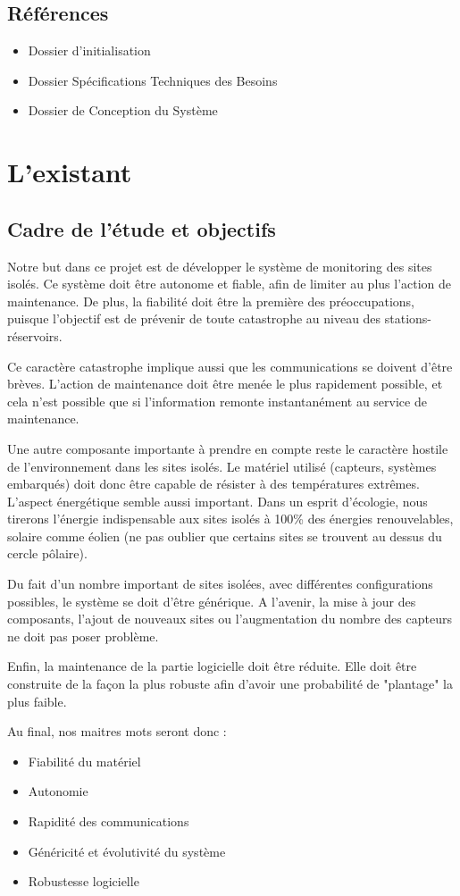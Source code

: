   \subsection{Références}
    \begin{itemize}
      \item Dossier d'initialisation
      \item Dossier Spécifications Techniques des Besoins
      \item Dossier de Conception du Système
    \end{itemize}  
      
\section{L'existant}
  \subsection{Cadre de l'étude et objectifs}  
  Notre but dans ce projet est de développer le système de monitoring des sites isolés. Ce système doit être autonome et fiable, afin de limiter au plus l'action de maintenance. De plus,  la fiabilité doit être la première des préoccupations, puisque l'objectif est de prévenir de toute catastrophe au niveau des stations-réservoirs.
\par Ce caractère catastrophe implique aussi que les communications se doivent d'être brèves. L'action de maintenance doit être menée le plus rapidement possible, et cela n'est possible que si l'information remonte instantanément au service de maintenance.
\par  Une autre composante importante à prendre en compte reste le caractère hostile de l'environnement dans les sites isolés. Le matériel utilisé (capteurs, systèmes embarqués) doit donc être capable de résister à des températures extrêmes. L'aspect énergétique semble aussi important. Dans un esprit d'écologie, nous tirerons l'énergie indispensable aux sites isolés à 100\% des énergies renouvelables, solaire comme éolien (ne pas oublier que certains sites se trouvent au dessus du cercle pôlaire).
\par Du fait d'un nombre important de sites isolées, avec différentes configurations possibles, le système se doit d'être générique. A l'avenir, la mise à jour des composants, l'ajout de nouveaux sites ou l'augmentation du nombre des capteurs ne doit pas poser problème.  
\par Enfin, la maintenance de la partie logicielle doit être réduite. Elle doit être construite de la façon la plus robuste afin d'avoir une probabilité de "plantage" la plus faible.
\par Au final, nos maitres mots seront donc :
  \begin{itemize}
    \item Fiabilité du matériel
    \item Autonomie
    \item Rapidité des communications
    \item Généricité et évolutivité du système
    \item Robustesse logicielle
  \end{itemize}
  
